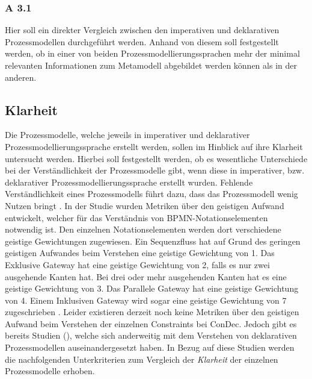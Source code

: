 \subsubsection{A 3.1}

Hier soll ein direkter Vergleich zwischen den imperativen und deklarativen Prozessmodellen durchgeführt werden. Anhand von diesem soll festgestellt werden, ob in einer von beiden Prozessmodellierungssprachen mehr der minimal relevanten Informationen zum Metamodell abgebildet werden können als in der anderen.\newline

\subsection{Klarheit}

Die Prozessmodelle, welche jeweils in imperativer und deklarativer Prozessmodellierungssprache erstellt werden, sollen im Hinblick auf ihre Klarheit untersucht werden. Hierbei soll festgestellt werden, ob es wesentliche Unterschiede bei der Verständlichkeit der Prozessmodelle gibt, wenn diese in imperativer, bzw. deklarativer Prozessmodellierungssprache erstellt wurden. Fehlende Verständlichkeit eines Prozessmodells führt dazu, dass das Prozessmodell wenig Nutzen bringt \cite{journals95, freund2007,reinshagen2009}. \newline
In der Studie \cite{gruhn2006adopting} wurden Metriken über den geistigen Aufwand entwickelt, welcher für das Verständnis von BPMN-Notationselementen notwendig ist. Den einzelnen Notationselementen werden dort verschiedene geistige Gewichtungen zugewiesen. Ein Sequenzfluss hat auf Grund des geringen geistigen Aufwandes beim Verstehen eine geistige Gewichtung von 1. Das Exklusive Gateway hat eine geistige Gewichtung von 2, falls es nur zwei ausgehende Kanten hat. Bei drei oder mehr ausgehenden Kanten hat es eine geistige Gewichtung von 3. Das Parallele Gateway hat eine geistige Gewichtung von 4. Einem Inklusiven Gateway wird sogar eine geistige Gewichtung von 7 zugeschrieben \cite{gruhn2006adopting}.\newline
Leider existieren derzeit noch keine Metriken über den geistigen Aufwand beim Verstehen der einzelnen Constraints bei ConDec. Jedoch gibt es bereits Studien (\cite{thesis_maja,haisjackl2014understanding, sabrina933}), welche sich anderweitig mit dem Verstehen von deklarativen Prozessmodellen auseinandergesetzt haben. In Bezug auf diese Studien werden die nachfolgenden Unterkriterien zum Vergleich der \textit{Klarheit} der einzelnen Prozessmodelle erhoben.

